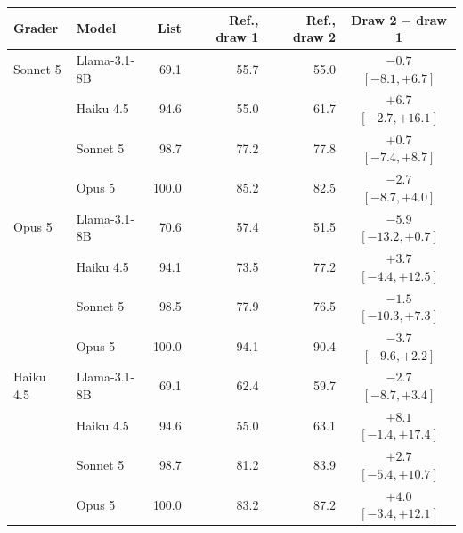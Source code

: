 \begin{tabular}{llrrrc}
\toprule
Grader & Model & List & Ref., draw 1 & Ref., draw 2 & Draw 2 $-$ draw 1 \\
\midrule
Sonnet 5 & Llama-3.1-8B & 69.1 & 55.7 & 55.0 & $-0.7$ {\scriptsize$[-8.1,+6.7]$} \\
 & Haiku 4.5 & 94.6 & 55.0 & 61.7 & $+6.7$ {\scriptsize$[-2.7,+16.1]$} \\
 & Sonnet 5 & 98.7 & 77.2 & 77.8 & $+0.7$ {\scriptsize$[-7.4,+8.7]$} \\
 & Opus 5 & 100.0 & 85.2 & 82.5 & $-2.7$ {\scriptsize$[-8.7,+4.0]$} \\
\addlinespace
Opus 5 & Llama-3.1-8B & 70.6 & 57.4 & 51.5 & $-5.9$ {\scriptsize$[-13.2,+0.7]$} \\
 & Haiku 4.5 & 94.1 & 73.5 & 77.2 & $+3.7$ {\scriptsize$[-4.4,+12.5]$} \\
 & Sonnet 5 & 98.5 & 77.9 & 76.5 & $-1.5$ {\scriptsize$[-10.3,+7.3]$} \\
 & Opus 5 & 100.0 & 94.1 & 90.4 & $-3.7$ {\scriptsize$[-9.6,+2.2]$} \\
\addlinespace
Haiku 4.5 & Llama-3.1-8B & 69.1 & 62.4 & 59.7 & $-2.7$ {\scriptsize$[-8.7,+3.4]$} \\
 & Haiku 4.5 & 94.6 & 55.0 & 63.1 & $+8.1$ {\scriptsize$[-1.4,+17.4]$} \\
 & Sonnet 5 & 98.7 & 81.2 & 83.9 & $+2.7$ {\scriptsize$[-5.4,+10.7]$} \\
 & Opus 5 & 100.0 & 83.2 & 87.2 & $+4.0$ {\scriptsize$[-3.4,+12.1]$} \\
\bottomrule
\end{tabular}
